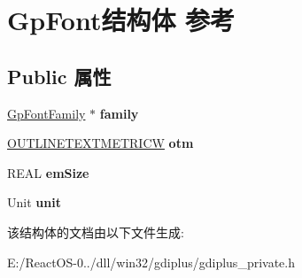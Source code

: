 \hypertarget{struct_gp_font}{}\section{Gp\+Font结构体 参考}
\label{struct_gp_font}
\subsection*{Public 属性}
\begin{DoxyCompactItemize}
\item 
\mbox{\label{struct_gp_font_a239ec366782d9f5f2dd633553f0f964f}} 
\hyperlink{struct_gp_font_family}{Gp\+Font\+Family} $\ast$ {\bfseries family}
\item 
\mbox{\label{struct_gp_font_a2554c3922482762476d6f22e42070b59}} 
\hyperlink{struct___o_u_t_l_i_n_e_t_e_x_t_m_e_t_r_i_c_w}{O\+U\+T\+L\+I\+N\+E\+T\+E\+X\+T\+M\+E\+T\+R\+I\+CW} {\bfseries otm}
\item 
\mbox{\label{struct_gp_font_ae4eb91ff7e1b640f49ea7f948e10d94a}} 
R\+E\+AL {\bfseries em\+Size}
\item 
\mbox{\label{struct_gp_font_a10eff25948bfc6b10e376ee17244404c}} 
Unit {\bfseries unit}
\end{DoxyCompactItemize}


该结构体的文档由以下文件生成\+:\begin{DoxyCompactItemize}
\item 
E\+:/\+React\+O\+S-\/0../dll/win32/gdiplus/gdiplus\+\_\+private.\+h\end{DoxyCompactItemize}
